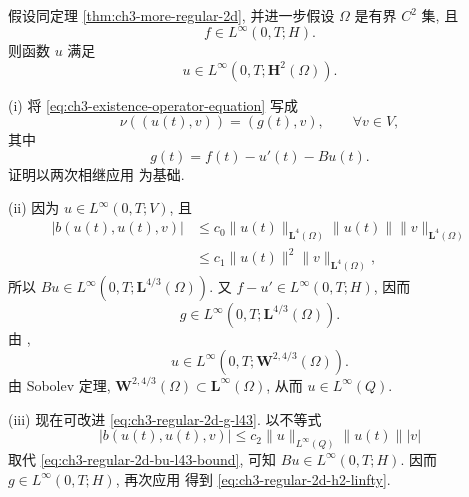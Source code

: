 \begin{Theorem}
\label{thm:ch3-regular-2d-h2}
假设同定理 \ref{thm:ch3-more-regular-2d}, 并进一步假设 $\Omega$ 是有界 $C^2$ 集, 且
\begin{equation}
f\in L^\infty(0,T;H).
\label{eq:ch3-regular-2d-force-linfty}
\end{equation}
则函数 $u$ 满足
\begin{equation}
u\in L^\infty(0,T;\mathbf H^2(\Omega)).
\label{eq:ch3-regular-2d-h2-linfty}
\end{equation}
\end{Theorem}

\begin{Proof}
(i) 将 \eqref{eq:ch3-existence-operator-equation} 写成
\begin{equation}
\nu((u(t),v))=(g(t),v),
\qquad\forall v\in V,
\label{eq:ch3-regular-2d-stationary-equation}
\end{equation}
其中
\begin{equation}
g(t)=f(t)-u'(t)-Bu(t).
\label{eq:ch3-regular-2d-g-definition}
\end{equation}
证明以两次相继应用  为基础.

(ii) 因为 $u\in L^\infty(0,T;V)$, 且
\begin{equation}
\begin{aligned}
|b(u(t),u(t),v)|
&\leq c_0\lVert u(t)\rVert_{\mathbf L^4(\Omega)}
\lVert u(t)\rVert\lVert v\rVert_{\mathbf L^4(\Omega)}\\
&\leq c_1\lVert u(t)\rVert^2\lVert v\rVert_{\mathbf L^4(\Omega)},
\end{aligned}
\label{eq:ch3-regular-2d-bu-l43-bound}
\end{equation}
所以 $Bu\in L^\infty(0,T;\mathbf L^{4/3}(\Omega))$. 又 $f-u'\in L^\infty(0,T;H)$, 因而
\begin{equation}
g\in L^\infty(0,T;\mathbf L^{4/3}(\Omega)).
\label{eq:ch3-regular-2d-g-l43}
\end{equation}
由 ,
\[
u\in L^\infty(0,T;\mathbf W^{2,4/3}(\Omega)).
\]
由 Sobolev 定理, $\mathbf W^{2,4/3}(\Omega)\subset\mathbf L^\infty(\Omega)$, 从而 $u\in L^\infty(Q)$.

(iii) 现在可改进 \eqref{eq:ch3-regular-2d-g-l43}. 以不等式
\[
|b(u(t),u(t),v)|\leq c_2\lVert u\rVert_{L^\infty(Q)}\lVert u(t)\rVert|v|
\]
取代 \eqref{eq:ch3-regular-2d-bu-l43-bound}, 可知 $Bu\in L^\infty(0,T;H)$. 因而 $g\in L^\infty(0,T;H)$, 再次应用  得到 \eqref{eq:ch3-regular-2d-h2-linfty}.
\end{Proof}

